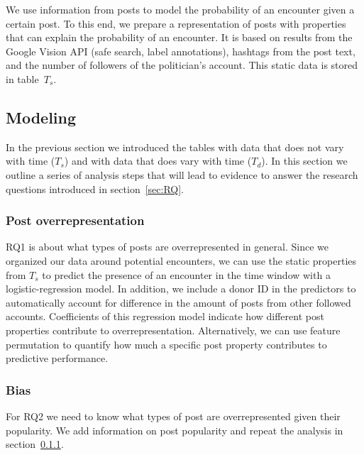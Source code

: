 \documentclass[a4paper]{article}
\begin{document}
We use information from posts to model the probability of an encounter given
a certain post. To this end, we prepare a representation of posts with
properties that can explain the probability of an encounter. It is based on
results from the Google Vision API (safe search, label annotations), hashtags
from the post text, and the number of followers of the politician's account.
This static data is stored in table~$T_s$.

\subsection{Modeling}
In the previous section we introduced the tables with data that does not vary
with time ($T_s$) and with data that does vary with time ($T_d$). In this
section we outline a series of analysis steps that will lead to evidence to
answer the research questions introduced in section~\ref{sec:RQ}.

\subsubsection{Post overrepresentation} \label{sec:overrep}
RQ1 is about what types of posts are overrepresented in general. Since we
organized our data around potential encounters, we can use the static
properties from $T_s$ to predict the presence of an encounter in the time
window with a logistic-regression model. In addition, we include a donor ID
in the predictors to automatically account for difference in the amount of
posts from other followed accounts. Coefficients of this regression model
indicate how different post properties contribute to overrepresentation.
Alternatively, we can use feature permutation to quantify how much a specific
post property contributes to predictive performance.

\subsubsection{Bias} \label{sec:bias}
For RQ2 we need to know what types of post are overrepresented given their
popularity. We add information on post popularity and repeat the analysis in
section~\ref{sec:overrep}.
\end{document}
